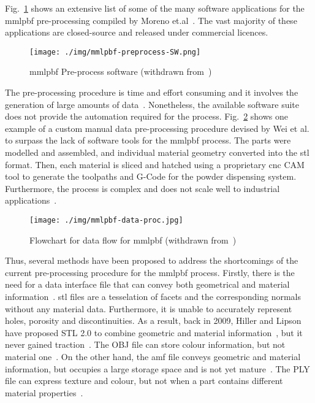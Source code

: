 Fig.~\ref{fig:mmlpbf-preprocess-SW}
shows an extensive list of some of the many software applications for the
\gls{mmlpbf} pre-processing compiled by Moreno et.al~\cite{moreno2021design}. The vast majority of these applications are
closed-source and released under commercial licences.

% 
\begin{figure}[!hbtp]
  \centering
  \texttt{[image: ./img/mmlpbf-preprocess-SW.png]}%
  \caption[MMLPBF Pre-Process software]{\gls{mmlpbf} Pre-process software
    (withdrawn from~\cite{moreno2021design}\footnotemark)}%
  \label{fig:mmlpbf-preprocess-SW}
\end{figure}
%

The pre-processing procedure is time and effort consuming and it involves the
generation of large amounts of data~\cite{binder2018potentials,
  schneck2021review, wang2022recent}. Nonetheless, the available software
suite does not provide the automation required for the process.
Fig.~\ref{fig:mmlpbf-data-proc} shows one example of a custom manual data
pre-processing procedure devised by Wei et al.~\cite{wei20183d} to surpass the
lack of software tools for the \gls{mmlpbf} process. The parts were modelled and assembled, and
individual material geometry converted into the \gls{stl} format. Then, each
material is sliced and hatched using a proprietary \gls{cnc} CAM tool to
generate the toolpaths and G-Code for the powder dispensing system.
Furthermore, the process is complex and does not scale well to industrial applications~\cite{wang2022recent}.

\begin{figure}[!hbtp]
  \centering
 \texttt{[image: ./img/mmlpbf-data-proc.jpg]} 
 \caption[Flowchart for data flow for \gls{mmlpbf}]{Flowchart for data flow for \gls{mmlpbf} (withdrawn from~\cite{wei20183d})\footnotemark}%
\label{fig:mmlpbf-data-proc}
\end{figure}
%

Thus, several methods have been proposed to address the shortcomings of the current
pre-processing procedure for the \gls{mmlpbf} process.
Firstly, there is the need for a data interface file that can convey both
geometrical and material information~\cite{wang2022recent}. \gls{stl} files are
a tesselation of facets and the corresponding normals without any material
data. Furthermore, it is unable to accurately represent holes,
porosity and discontinuities. As a result, back in 2009, Hiller and Lipson have proposed STL 2.0 to combine geometric and
material information~\cite{hiller2009stl}, but it never gained
traction~\cite{wang2022recent}. The OBJ file can store colour information, but
not material one~\cite{wang2022recent}. On the other hand, the \gls{amf} file
conveys geometric and material information, but occupies a large storage space
and is not yet mature~\cite{chenyan2019multi, shi2017status}. The PLY file can
express texture and colour, but not when a part contains different material
properties~\cite{xiaowei2017new}.

